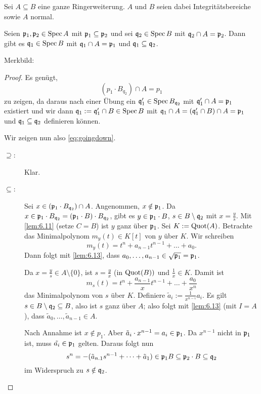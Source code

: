 \documentclass[12pt,a4paper]{scrartcl}
\theoremstyle{cplain}
\theoremstyle{cdef}
\begin{document}
\begin{satz} \label{thm:going down}
	Sei $A\subseteq B$ eine ganze Ringerweiterung. $A$ und $B$ seien dabei Integritätsbereiche sowie $A$ normal.
	
	Seien $\mathfrak{p}_1,\mathfrak{p}_2\in \operatorname{Spec} A$ mit $\mathfrak{p}_1\subseteq \mathfrak{p}_2$ und sei $\mathfrak{q}_2\in\operatorname{Spec} B$ mit $\mathfrak{q}_2\cap A = \mathfrak{p}_2$. Dann gibt es $\mathfrak{q}_1\in\operatorname{Spec} B$ mit $\mathfrak{q}_1\cap A = \mathfrak{p}_1$ und $\mathfrak{q}_1\subseteq \mathfrak{q}_2$.
	
	Merkbild:
	\begin{center}
	\end{center}
\end{satz}
\begin{proof}
	Es genügt, \begin{equation}(p_1\cdot B_{q_2})\cap A = p_1 \tag{*}\label{eq:goingdown}\end{equation} zu zeigen, da daraus nach einer Übung ein $\mathfrak{q}_1' \in \operatorname{Spec} B_{\mathfrak{q}_2}$ mit $\mathfrak{q}_1'\cap A = \mathfrak{p}_1$ existiert und wir dann $\mathfrak{q}_1 := \mathfrak{q}_1'\cap B\in\operatorname{Spec} B$ mit $\mathfrak{q}_1\cap A = (\mathfrak{q}_1'\cap B)\cap A = \mathfrak{p}_1$ und $\mathfrak{q}_1\subseteq \mathfrak{q}_2$ definieren können.
	
	Wir zeigen nun also \eqref{eq:goingdown}.
	\begin{description}
		\item[\glqq$\supseteq$\grqq:] Klar.
		\item[\glqq$\subseteq$\grqq:] Sei $x\in (\mathfrak{p}_1\cdot B_{\mathfrak{q}_2})\cap A$. Angenommen, $x\notin \mathfrak{p}_1$. Da $x\in \mathfrak{p}_1\cdot B_{\mathfrak{q}_2} = (\mathfrak{p}_1\cdot B)\cdot B_{\mathfrak{q}_2}$, gibt es $y\in \mathfrak{p}_1\cdot B$, $s\in B\setminus \mathfrak{q}_2$ mit $x = \frac ys$. Mit \cref{lem:6.11} (setze $C = B$) ist $y$ ganz über $\mathfrak{p}_1$. Sei $K := \operatorname{Quot}(A)$. Betrachte das Minimalpolynom $m_y(t) \in K[t]$ von $y$ über $K$. Wir schreiben 
		\[m_y(t) = t^n+a_{n-1}t^{n-1}+\dots+a_0.\]
		Dann folgt mit \cref{lem:6.13}, dass $a_0,\dots, a_{n-1}\in\sqrt{\mathfrak{p}_1} = \mathfrak{p}_1$.
		
		Da $x = \frac ys\in A\setminus\{0\}$, ist $s = \frac yx$ (in $\operatorname{Quot}(B))$ und $\frac 1x \in K$. Damit ist
		\[m_s(t) = t^n+\frac{a_{n-1}}xt^{n-1}+\dots + \frac {a_0}{x^n}\]
		das Minimalpolynom von $s$ über $K$. Definiere $\tilde{a}_i := \frac{1}{x^{n-i}}a_i$. Es gilt $s\in B\setminus \mathfrak{q}_2\subseteq B$, also ist $s$ ganz über $A$; also folgt mit \cref{lem:6.13} (mit $I = A$), dass $\tilde{a}_0,\dots, \tilde{a}_{n-1}\in A$.
		
		Nach Annahme ist $x\notin p_1$. Aber $\tilde{a}_i\cdot x^{n-1} = a_i\in \mathfrak{p}_1$. Da $x^{n-1}$ nicht in $\mathfrak{p}_1$ ist, muss $\tilde{a_i}\in \mathfrak{p}_1$ gelten. Daraus folgt nun
		\[s^n = -(\tilde{a}_{n.1}s^{n-1}+\dots+\tilde{a}_1)\in \mathfrak{p}_1B\subseteq \mathfrak{p}_2\cdot B\subseteq \mathfrak{q}_2\]
		im Widerspruch zu $s\notin \mathfrak{q}_2$.
		\qedhere
	\end{description}
\end{proof}
\end{document}

